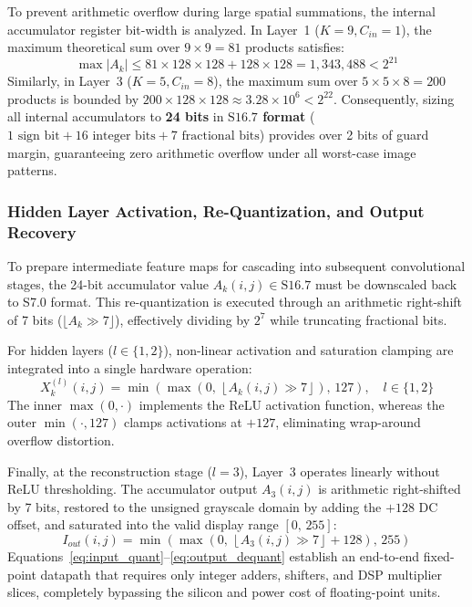 \documentclass[conference]{IEEEtran}
\begin{document}
To prevent arithmetic overflow during large spatial summations, the internal accumulator register bit-width is analyzed. In Layer~1 ($K = 9, C_{in} = 1$), the maximum theoretical sum over $9 \times 9 = 81$ products satisfies:
\begin{equation}
\max |A_k| \le 81 \times 128 \times 128 + 128 \times 128 = 1,343,488 < 2^{21}
\label{eq:accumulator_bound}
\end{equation}
Similarly, in Layer~3 ($K=5, C_{in}=8$), the maximum sum over $5 \times 5 \times 8 = 200$ products is bounded by $200 \times 128 \times 128 \approx 3.28 \times 10^6 < 2^{22}$. Consequently, sizing all internal accumulators to \textbf{24 bits} in \textbf{$\text{S16.7}$ format} ($1\text{ sign bit} + 16\text{ integer bits} + 7\text{ fractional bits}$) provides over 2 bits of guard margin, guaranteeing zero arithmetic overflow under all worst-case image patterns.

\subsubsection{Hidden Layer Activation, Re-Quantization, and Output Recovery}
To prepare intermediate feature maps for cascading into subsequent convolutional stages, the 24-bit accumulator value $A_k(i, j) \in \text{S16.7}$ must be downscaled back to S7.0 format. This re-quantization is executed through an arithmetic right-shift of 7 bits ($\lfloor A_k \gg 7 \rfloor$), effectively dividing by $2^7$ while truncating fractional bits. 

For hidden layers ($l \in \{1, 2\}$), non-linear activation and saturation clamping are integrated into a single hardware operation:
\begin{equation}
X_k^{(l)}(i, j) = \min\left(\max\left(0,\, \left\lfloor A_k(i, j) \gg 7 \right\rfloor\right),\, 127\right), \quad l \in \{1, 2\}
\label{eq:layer_activation}
\end{equation}
The inner $\max(0, \cdot)$ implements the ReLU activation function, whereas the outer $\min(\cdot, 127)$ clamps activations at $+127$, eliminating wrap-around overflow distortion.

Finally, at the reconstruction stage ($l = 3$), Layer~3 operates linearly without ReLU thresholding. The accumulator output $A_3(i, j)$ is arithmetic right-shifted by 7 bits, restored to the unsigned grayscale domain by adding the $+128$ DC offset, and saturated into the valid display range $[0,\, 255]$:
\begin{equation}
I_{out}(i, j) = \min\left(\max\left(0,\, \left\lfloor A_3(i, j) \gg 7 \right\rfloor + 128\right),\, 255\right)
\label{eq:output_dequant}
\end{equation}
Equations~\eqref{eq:input_quant}--\eqref{eq:output_dequant} establish an end-to-end fixed-point datapath that requires only integer adders, shifters, and DSP multiplier slices, completely bypassing the silicon and power cost of floating-point units.



\end{document}
